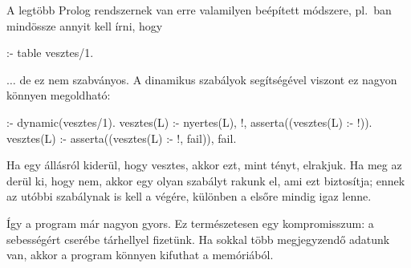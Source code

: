 A legtöbb Prolog rendszernek van erre valamilyen beépített módszere,
pl.~ban mindössze annyit kell írni, hogy
\begin{program}
:- table vesztes/1.
\end{program}
$\dots$ de ez nem szabványos. A dinamikus szabályok segítségével viszont
ez nagyon könnyen megoldható:
\begin{program}
:- dynamic(vesztes/1). 
vesztes(L) :-
    \+ nyertes(L), !,
    asserta((vesztes(L) :- !)). 
vesztes(L) :-
    asserta((vesztes(L) :- !, fail)),
    fail. 
\end{program}
Ha egy állásról kiderül, hogy vesztes, akkor ezt, mint tényt, elrakjuk.
Ha meg az derül ki, hogy nem, akkor egy olyan szabályt rakunk el,
ami ezt biztosítja; ennek az utóbbi szabálynak is  kell a végére,
különben a  elsőre mindig igaz lenne.

Így a program már nagyon gyors. Ez természetesen egy kompromisszum:
a sebességért cserébe tárhellyel fizetünk. Ha sokkal több megjegyzendő adatunk van,
akkor a program könnyen kifuthat a memóriából.

